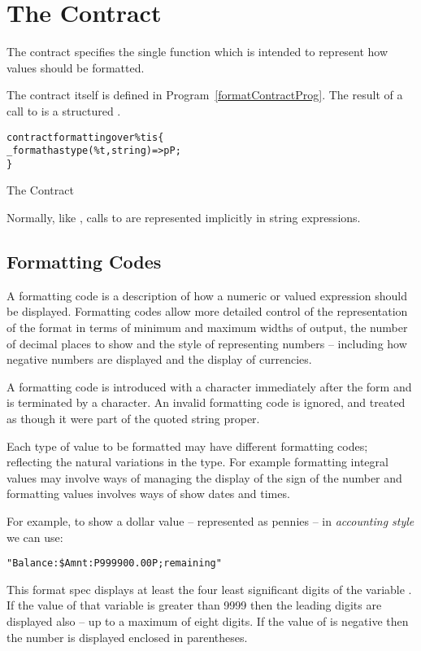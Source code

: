 \section{The  Contract}
\label{formatContract}
The  contract specifies the single  function which is intended to represent how values should be formatted.

The  contract itself is defined in Program~\vref{formatContractProg}. The result of a call to  is a structured .

\begin{program}
\begin{alltt}
contract formatting over \%t is \{
  \_format has type (\%t,string)=>pP;
\}
\end{alltt}
\caption{The  Contract\label{formatContractProg}}
\end{program}



\begin{aside}
Normally, like , calls to  are represented implicitly in string  expressions.
\end{aside}
\subsection{Formatting Codes}
\label{formattingCodes}
A formatting code is a description of how a numeric or  valued expression should be displayed. Formatting codes allow more detailed control of the representation of the format in terms of minimum and maximum widths of output, the number of decimal places to show and the style of representing numbers -- including how negative numbers are displayed and the display of currencies.

A formatting code is introduced with a \q{:} character immediately after the \q{\$} form and is terminated by a \q{;} character. An invalid formatting code is ignored, and treated as though it were part of the quoted string proper.

Each type of value to be formatted may have different formatting codes; reflecting the natural variations in the type. For example formatting integral values may involve ways of managing the display of the sign of the number and formatting  values involves ways of show dates and times.

For example, to show a dollar value -- represented as pennies -- in \emph{accounting style} we can use:
\begin{alltt}
"Balance: \$Amnt:P999900.00P; remaining"
\end{alltt}
This format spec displays at least the four least significant digits of the variable . If the value of that variable is greater than 9999 then the leading digits are displayed also -- up to a maximum of eight digits. If the value of  is negative then the number is displayed enclosed in parentheses.

